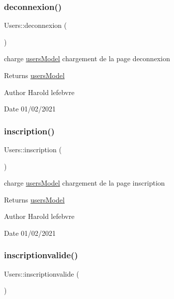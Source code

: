 \subsubsection{\texorpdfstring{deconnexion()}{deconnexion()}}
{\footnotesize\ttfamily Users\+::deconnexion (\begin{DoxyParamCaption}{ }\end{DoxyParamCaption})}



charge \mbox{\hyperlink{classusers_model}{users\+Model}} chargement de la page deconnexion 

\begin{DoxyReturn}{Returns}
\mbox{\hyperlink{classusers_model}{users\+Model}} 
\end{DoxyReturn}
\begin{DoxyAuthor}{Author}
Harold lefebvre 
\end{DoxyAuthor}
\begin{DoxyDate}{Date}
01/02/2021 
\end{DoxyDate}
\mbox{\label{class_users_a37b13945f573db56d2befc79f7e03ca7}} 
\subsubsection{\texorpdfstring{inscription()}{inscription()}}
{\footnotesize\ttfamily Users\+::inscription (\begin{DoxyParamCaption}{ }\end{DoxyParamCaption})}



charge \mbox{\hyperlink{classusers_model}{users\+Model}} chargement de la page inscription 

\begin{DoxyReturn}{Returns}
\mbox{\hyperlink{classusers_model}{users\+Model}} 
\end{DoxyReturn}
\begin{DoxyAuthor}{Author}
Harold lefebvre 
\end{DoxyAuthor}
\begin{DoxyDate}{Date}
01/02/2021 
\end{DoxyDate}
\mbox{\label{class_users_ad6131e845a9e8eadd576c95525110e95}} 
\subsubsection{\texorpdfstring{inscriptionvalide()}{inscriptionvalide()}}
{\footnotesize\ttfamily Users\+::inscriptionvalide (\begin{DoxyParamCaption}{ }\end{DoxyParamCaption})}



